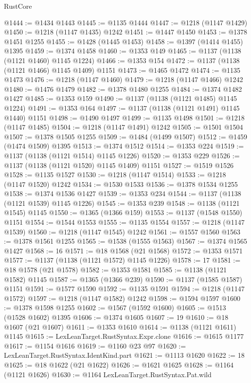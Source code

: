 \begin{lexlean}{RustCore}
\begin{coremodule}
@1444 := @1434 @1443
@1445 := @1135 @1444
@1447 := @1218 (@1147 @1429)
@1450 := @1218 (@1147 @1435) @1242
@1451 := @1447 @1450
@1453 := @1378 @1451 @1255
@1455 := @1428 (@1445 @1453)
@1458 := @1397 (@1414 @1455) @1395
@1459 := @1374 @1458
@1460 := @1353 @149
@1465 := @1137 (@1138 (@1121 @1460) @1145 @1224)
@1466 := @1353 @154
@1472 := @1137 (@1138 (@1121 @1466) @1145 @1409) @1151
@1473 := @1465 @1472
@1474 := @1135 @1473
@1476 := @1218 (@1147 @1460)
@1479 := @1218 (@1147 @1466) @1242
@1480 := @1476 @1479
@1482 := @1378 @1480 @1255
@1484 := @1374 @1482 @1427
@1485 := @1353 @159
@1490 := @1137 (@1138 (@1121 @1485) @1145 @1224)
@1491 := @1353 @164
@1497 := @1137 (@1138 (@1121 @1491) @1145 @1440) @1151
@1498 := @1490 @1497
@1499 := @1135 @1498
@1501 := @1218 (@1147 @1485)
@1504 := @1218 (@1147 @1491) @1242
@1505 := @1501 @1504
@1507 := @1378 @1505 @1255
@1509 := @1484 (@1499 @1507)
@1512 := @1459 (@1474 @1509) @1395
@1513 := @1374 @1512
@1514 := @1353 @224
@1519 := @1137 (@1138 (@1121 @1514) @1145 @1226)
@1520 := @1353 @229
@1526 := @1137 (@1138 (@1121 @1520) @1145 @1409) @1151
@1527 := @1519 @1526
@1528 := @1135 @1527
@1530 := @1218 (@1147 @1514)
@1533 := @1218 (@1147 @1520) @1242
@1534 := @1530 @1533
@1536 := @1378 @1534 @1255
@1538 := @1374 @1536 @1427
@1539 := @1353 @234
@1544 := @1137 (@1138 (@1121 @1539) @1145 @1226)
@1545 := @1353 @239
@1548 := @1138 (@1121 @1545) @1145
@1550 := @1365 (@1366 @159)
@1553 := @1137 (@1548 @1550) @1151
@1554 := @1544 @1553
@1555 := @1135 @1554
@1557 := @1218 (@1147 @1539)
@1560 := @1218 (@1147 @1545) @1242
@1561 := @1557 @1560
@1563 := @1378 @1561 @1255
@1565 := @1538 (@1555 @1563)
@1567 := @1374 @1565 @1427
@1568 := 16
@1571 := @18 @1568 (@21 @1568)
@1572 := @1353 @1571
@1577 := @1137 (@1138 (@1121 @1572) @1145 @1226)
@1578 := 17
@1581 := @18 @1578 (@21 @1578)
@1582 := @1353 @1581
@1585 := @1138 (@1121 @1582) @1145
@1587 := @1365 (@1366 @239)
@1590 := @1137 (@1585 @1587) @1151
@1591 := @1577 @1590
@1592 := @1135 @1591
@1594 := @1218 (@1147 @1572)
@1597 := @1218 (@1147 @1582) @1242
@1598 := @1594 @1597
@1600 := @1378 @1598 @1255
@1602 := @1567 (@1592 @1600)
@1605 := @1513 (@1528 @1602) @1395
@1606 := @1374 @1605
@1607 := 19
@1610 := @18 @1607 (@21 @1607)
@1611 := @1353 @1610
@1614 := @1138 (@1121 @1611) @1145
@1615 := LexLeanTarget.RustSyntax.Expr.clone
@1616 := @1615 @1177
@1617 := @1154 @1616
@1619 := @1160 @23 @97
@1620 := LexLeanTarget.RustSyntax.IdentKind.part
@1621 := @1113 @1620
@1622 := 18
@1625 := @18 @1622 (@21 @1622)
@1626 := @1621 @1625
@1628 := @1164 (@1121 @1626)
@1630 := @1164 LexLeanTarget.RustSyntax.Pat.wild

\end{coremodule}
\end{lexlean}
